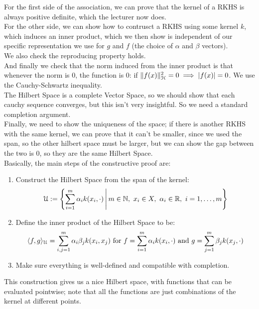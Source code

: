 \documentclass[12pt]{article}
\begin{document}
For the first side of the association,
we can prove that the kernel of a RKHS 
is always positive definite, which the 
lecturer now does. \\

For the other side, 
we can show how to contrusct a RKHS using
some kernel $k$, which induces an inner product,
which we then show is independent of
our specific representation we use for $g$
and $f$ (the choice of $\alpha$ and $\beta$ vectors). \\
We also check the reproducing property holds. \\
And finally we check that the norm induced from the
inner product is that whenever the norm is $0$,
the function is $0$: if $\|f(x)\|^2_{\mathcal{H}} = 0 \implies
|f(x)| = 0$. We use the Cauchy-Schwartz inequality. \\
The Hilbert Space is a complete Vector Space,
so we should show that each cauchy sequence
converges, but this isn't very insightful. 
So we need a standard completion argument. \\
Finally, we need to show the uniqueness of the space;
if there is another RKHS with the same kernel, we
can prove that it can't be smaller, since we
used the span, so the other hilbert space must be
larger, but we can show the gap between the two
is 0, so they are the same Hilbert Space. \\

Basically, the main steps of the
constructive proof are:
\begin{enumerate}
    \item Construct the Hilbert Space
    from the span of the kernel:
    \[\ucal := 
    \left\{ \sum_{i=1}^{m} \alpha_i k(x_i, \cdot) 
    \,\middle|\, m \in \mathbb{N},\ x_i \in X,\ 
    \alpha_i \in \mathbb{R},\ i = 1, \ldots, 
    m \right\}\]
    \item Define the inner product of the Hilbert
    Space to be:
    \[ \langle f, g \rangle_{\mathcal{U}} =
    \sum_{i,j=1}^{m} \alpha_i \beta_j k(x_i, x_j) 
    \text{ for } f = \sum_{i=1}^{m} \alpha_i 
    k(x_i, \cdot)\text{ and } g = \sum_{j=1}^{m} 
    \beta_j k(x_j, \cdot) \]
    \item Make sure everything is 
    well-defined and compatible with completion.
\end{enumerate}
This construction gives us a nice Hilbert space,
with functions that can be evaluated pointwise;
note that all the functions are just combinations
of the kernel at different points. \\
\end{document}
